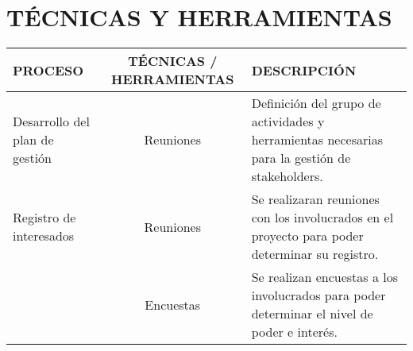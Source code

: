 \chapter{T\'ECNICAS Y HERRAMIENTAS}
%
\begin{table}[H]
	\centering
	\begin{tabular}{| m{5cm} | c | p{5cm} |}
	\hline
	\rowcolor{LightGrey}
	\textbf{PROCESO} & \textbf{T\'ECNICAS / HERRAMIENTAS} & \textbf{DESCRIPCI\'ON} \\ \hline
	Desarrollo del plan de gesti\'on & Reuniones & Definici\'on del grupo de actividades y herramientas necesarias para la gesti\'on de stakeholders.\\
	\hline
	Registro de interesados & Reuniones & Se realizaran reuniones con los involucrados en 
	el proyecto para poder determinar su registro. \\ 
	  \cline{2-3}
	 & Encuestas & Se realizan encuestas a los involucrados para poder determinar el nivel
	 de poder e inter\'es. \\
	\hline
	\end{tabular}
\end{table}